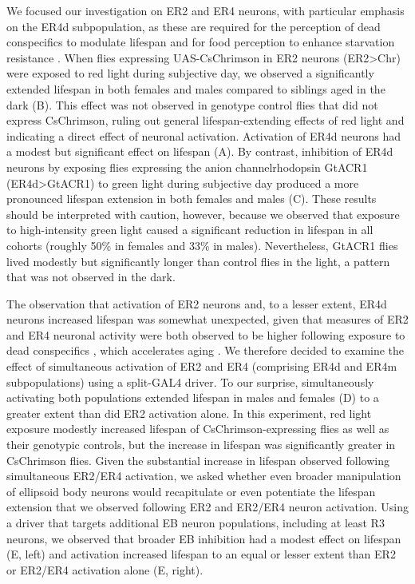 We focused our investigation on ER2 and ER4 neurons, with particular emphasis on the ER4d subpopulation, as these are required for the perception of dead conspecifics to modulate lifespan \citep{gendron2023} and for food perception to enhance starvation resistance \citep{luo2021}. 
When flies expressing UAS-CsChrimson \citep{klapoetke2014} in ER2 neurons (ER2>Chr) were exposed to red light during subjective day, we observed a significantly extended lifespan in both females and males compared to siblings aged in the dark (B). 
This effect was not observed in genotype control flies that did not express CsChrimson, ruling out general lifespan-extending effects of red light and indicating a direct effect of neuronal activation. 
Activation of ER4d neurons had a modest but significant effect on lifespan (A). 
By contrast, inhibition of ER4d neurons by exposing flies expressing the anion channelrhodopsin GtACR1 \citep{mohammad2017} (ER4d>GtACR1) to green light during subjective day produced a more pronounced lifespan extension in both females and males (C).
These results should be interpreted with caution, however, because we observed that exposure to high-intensity green light caused a significant reduction in lifespan in all cohorts (roughly 50\% in females and 33\% in males). 
Nevertheless, GtACR1 flies lived modestly but significantly longer than control flies in the light, a pattern that was not observed in the dark.

The observation that activation of ER2 neurons and, to a lesser extent, ER4d neurons increased lifespan was somewhat unexpected, given that measures of ER2 and ER4 neuronal activity were both observed to be higher following exposure to dead conspecifics \citep{gendron2023}, which accelerates aging \citep{chakraborty2019}. 
We therefore decided to examine the effect of simultaneous activation of ER2 and ER4 (comprising ER4d and ER4m subpopulations) using a split-GAL4 driver. 
To our surprise, simultaneously activating both populations extended lifespan in males and females (D) to a greater extent than did ER2 activation alone. 
In this experiment, red light exposure modestly increased lifespan of CsChrimson-expressing flies as well as their genotypic controls, but the increase in lifespan was significantly greater in CsChrimson flies. 
Given the substantial increase in lifespan observed following simultaneous ER2/ER4 activation, we asked whether even broader manipulation of ellipsoid body neurons would recapitulate or even potentiate the lifespan extension that we observed following ER2 and ER2/ER4 neuron activation. 
Using a driver that targets additional EB neuron populations, including at least R3 neurons, we observed that broader EB inhibition had a modest effect on lifespan (E, left) and activation increased lifespan to an equal or lesser extent than ER2 or ER2/ER4 activation alone (E, right). 

